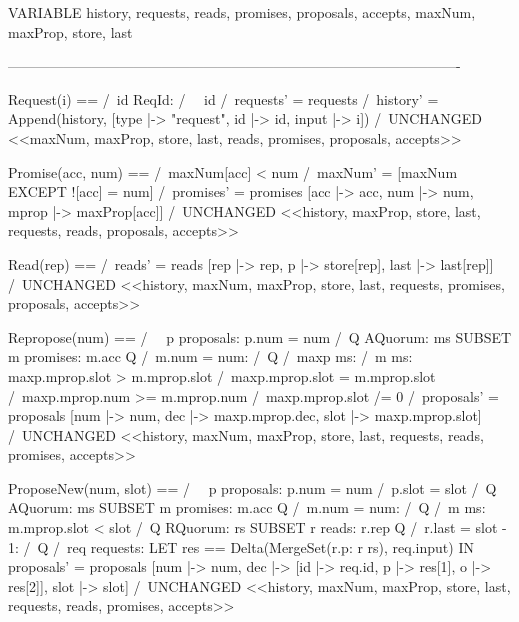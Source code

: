 \documentclass[12pt,a4paper,en]{pracamgr}
\begin{document}
\begin{tla}
VARIABLE
    history,
    requests, reads, promises, proposals, accepts,
    maxNum, maxProp,
    store, last

-------------------------------------------------------------------------------------------------

Request(i) ==
    /\ \E id \in ReqId:
        /\ ~ id 
        /\ requests' = requests \cup {[id |-> id, input |-> i]}
        /\ history' = Append(history, [type |-> "request", id |-> id, input |-> i])
    /\ UNCHANGED <<maxNum, maxProp, store, last,
                   reads, promises, proposals, accepts>>

Promise(acc, num) ==
    /\ maxNum[acc] < num
    /\ maxNum' = [maxNum EXCEPT ![acc] = num]
    /\ promises' = promises \cup
        {[acc |-> acc, num |-> num, mprop |-> maxProp[acc]]}
    /\ UNCHANGED <<history, maxProp, store, last,
                   requests, reads, proposals, accepts>>

Read(rep) ==
    /\ reads' = reads \cup
        {[rep |-> rep, p |-> store[rep], last |-> last[rep]]}
    /\ UNCHANGED <<history, maxNum, maxProp, store, last,
                   requests, promises, proposals, accepts>>

Repropose(num) ==
    /\ ~ \E p \in proposals: p.num = num
    /\ \E Q \in AQuorum:
        \E ms \in SUBSET {m \in promises: m.acc \in Q /\ m.num = num}:
            /\ Q 
            /\ \E maxp \in ms:
                /\ \A m \in ms:
                    \/ maxp.mprop.slot > m.mprop.slot
                    \/ /\ maxp.mprop.slot = m.mprop.slot
                       /\ maxp.mprop.num >= m.mprop.num
                /\ maxp.mprop.slot /= 0
                /\ proposals' = proposals \cup
                    {[num |-> num,
                      dec |-> maxp.mprop.dec,
                      slot |-> maxp.mprop.slot]}
    /\ UNCHANGED <<history, maxNum, maxProp, store, last,
                   requests, reads, promises, accepts>>

ProposeNew(num, slot) ==
    /\ ~ \E p \in proposals: p.num = num /\ p.slot = slot
    /\ \E Q \in AQuorum:
        \E ms \in SUBSET {m \in promises: m.acc \in Q /\ m.num = num}:
            /\ Q 
            /\ \A m \in ms: m.mprop.slot < slot
    /\ \E Q \in RQuorum:
        \E rs \in SUBSET {r \in reads: r.rep \in Q /\ r.last = slot - 1}:
            /\ Q 
            /\ \E req \in requests:
                LET res == Delta(MergeSet({r.p: r \in rs}), req.input)
                 IN proposals' = proposals \cup
                    {[num |-> num,
                      dec |-> [id |-> req.id, p |-> res[1], o |-> res[2]],
                      slot |-> slot]}
    /\ UNCHANGED <<history, maxNum, maxProp, store, last,
                   requests, reads, promises, accepts>>


\end{tla}
\end{document}
